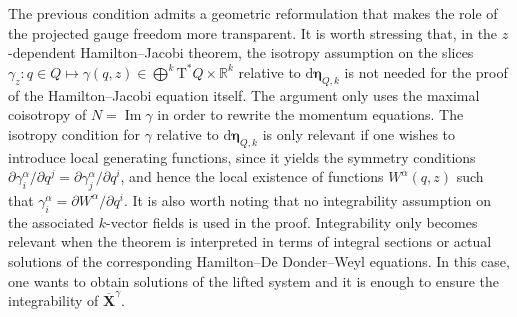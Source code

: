 \documentclass[11pt,twoside]{article}
\theoremstyle{plain}
\theoremstyle{definition}
\theoremstyle{remark}
\newcommand{\dd}{\mathrm{d}}
\newcommand{\T}{\mathrm{T}}
\DeclareMathOperator{\Ima}{Im}
\begin{document}
The previous condition admits a geometric reformulation that makes the role of the projected gauge freedom more transparent. It is worth stressing that, in the \(z\)-dependent Hamilton--Jacobi theorem, the isotropy assumption on the slices \(\gamma_z\colon q\in Q\mapsto \gamma(q,z)\in \bigoplus^k\T^*Q\times \mathbb{R}^k\) relative to $\dd\bm\eta_{Q,k}$ is not needed for the proof of the Hamilton--Jacobi equation itself. The argument only uses the maximal coisotropy of \(N=\Ima\gamma\) in order to rewrite the momentum equations. The isotropy condition for $\gamma$ relative to $\dd \bm\eta_{Q,k}$ is only relevant if one wishes to introduce local generating functions, since it yields the symmetry conditions \(\partial\gamma_i^\alpha/\partial q^j=\partial\gamma_j^\alpha/\partial q^i\), and hence the local existence of functions \(W^\alpha(q,z)\) such that \(\gamma_i^\alpha=\partial W^\alpha/\partial q^i\). It is also worth noting that no integrability assumption on the associated \(k\)-vector fields is used in the proof. Integrability only becomes relevant when the theorem is interpreted in terms of integral sections or actual solutions of the corresponding Hamilton--De Donder--Weyl equations. In this case, one wants to obtain solutions of the lifted system and it is enough to ensure the integrability of $\bm {\overline{X}}^\gamma$. 
\end{document}
